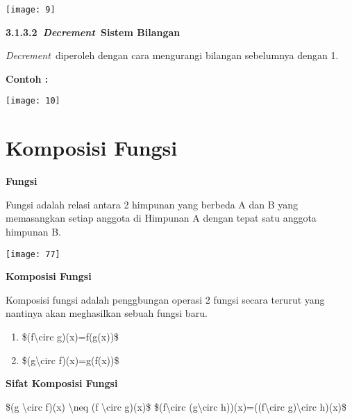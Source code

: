 \documentclass[11pt,fleqn]{book} %
\begin{document}
\begin{center}
\noindent \texttt{[image: 9]}
\end{center}

\noindent 

\noindent \textbf{3.1.3.2~\textit{Decrement~}Sistem Bilangan}

\textit{Decrement~}diperoleh dengan cara mengurangi bilangan sebelumnya dengan 1.

\noindent \textbf{Contoh :}

\begin{center}
\noindent \texttt{[image: 10]}
\end{center}

\noindent 

\noindent

\section{Komposisi Fungsi}

\noindent \textbf{Fungsi}

\noindent Fungsi adalah relasi antara 2 himpunan yang berbeda A dan B yang memasangkan setiap anggota di Himpunan A dengan tepat satu anggota himpunan B.

\begin{center}
\noindent \texttt{[image: 77]}
\end{center}

\noindent \textbf{Komposisi Fungsi }

\noindent Komposisi fungsi adalah penggbungan operasi 2 fungsi secara terurut yang nantinya akan meghasilkan sebuah fungsi baru.

\begin{enumerate}
\item  \$(f{\textbackslash}circ g)(x)=f(g(x))\$

\item  \$(g{\textbackslash}circ f)(x)=g(f(x))\$
\end{enumerate}

\noindent 

\noindent \textbf{Sifat Komposisi Fungsi }

\noindent \$(g {\textbackslash}circ f)(x) {\textbackslash}neq (f {\textbackslash}circ g)(x)\$ \$(f{\textbackslash}circ (g{\textbackslash}circ h))(x)=((f{\textbackslash}circ g){\textbackslash}circ h)(x)\$
\end{document}
